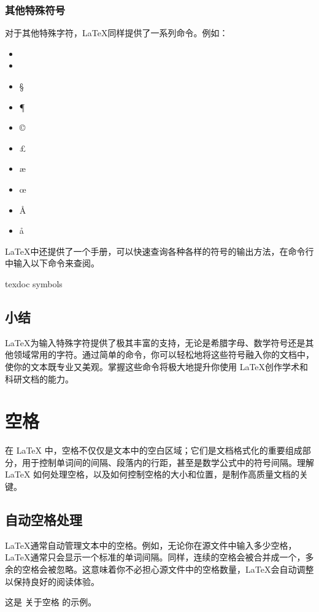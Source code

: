 {\subsubsection{其他特殊符号}
对于其他特殊字符，\LaTeX 同样提供了一系列命令。例如：

\begin{texlst}
\begin{itemize}[nosep]
	\item \dag
	\item \ddag
	\item \S
	\item \P
	\item \copyright
	\item \pounds
	\item \ae
	\item \oe
	\item \AA
	\item \aa
\end{itemize}
\end{texlst}

\LaTeX 中还提供了一个手册，可以快速查询各种各样的符号的输出方法，在命令行中输入以下命令来查阅。
\begin{shellcmd}
	texdoc symbols
\end{shellcmd}

\subsection{小结}
\LaTeX 为输入特殊字符提供了极其丰富的支持，无论是希腊字母、数学符号还是其他领域常用的字符。通过简单的命令，你可以轻松地将这些符号融入你的文档中，使你的文本既专业又美观。掌握这些命令将极大地提升你使用 \LaTeX 创作学术和科研文档的能力。

\section{空格}
在 LaTeX 中，空格不仅仅是文本中的空白区域；它们是文档格式化的重要组成部分，用于控制单词间的间隔、段落内的行距，甚至是数学公式中的符号间隔。理解 LaTeX 如何处理空格，以及如何控制空格的大小和位置，是制作高质量文档的关键。
\subsection{自动空格处理}
\LaTeX 通常自动管理文本中的空格。例如，无论你在源文件中输入多少空格，\LaTeX 通常只会显示一个标准的单词间隔。同样，连续的空格会被合并成一个，多余的空格会被忽略。这意味着你不必担心源文件中的空格数量，\LaTeX 会自动调整以保持良好的阅读体验。
\begin{texlst}
	这是 关于空格    的示例。
\end{texlst}

}
